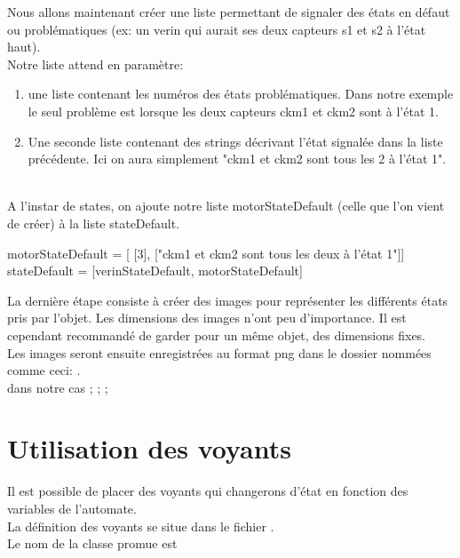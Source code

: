 \documentclass[12pt]{report}    %
\begin{document}
Nous allons maintenant créer une liste permettant de signaler des états en défaut ou problématiques (ex: un verin qui aurait ses deux capteurs s1 et s2 à l'état haut).\\

Notre liste attend en paramètre:
\begin{enumerate}
    \item une liste contenant les numéros des états problématiques. Dans notre exemple le seul problème est lorsque les deux capteurs ckm1 et ckm2 sont à l'état 1. 
    \item Une seconde liste contenant des strings décrivant l'état signalée dans la liste précédente. Ici on aura simplement "ckm1 et ckm2 sont tous les 2 à l'état 1".
\end{enumerate}\\

A l'instar de states, on ajoute notre liste motorStateDefault (celle que l'on vient de créer) à la liste stateDefault.

\begin{pyCode}
    motorStateDefault = [ [3], ["ckm1 et ckm2 sont tous les deux à l'état 1"]]
    stateDefault = [verinStateDefault, motorStateDefault]
\end{pyCode}



La dernière étape consiste à créer des images pour représenter les différents états pris par l'objet. Les dimensions des images n'ont peu d'importance. Il est cependant recommandé de garder pour un même objet, des dimensions fixes. \\

Les images seront ensuite enregistrées au format png dans le dossier   nommées comme ceci: .\\

dans notre cas  ;  ;  ; 



\newpage
\section{Utilisation des voyants}

Il est possible de placer des voyants qui changerons d'état en fonction des variables de l'automate. \\
La définition des voyants se situe dans le fichier .\\
Le  nom de la classe promue est 
\end{document}
